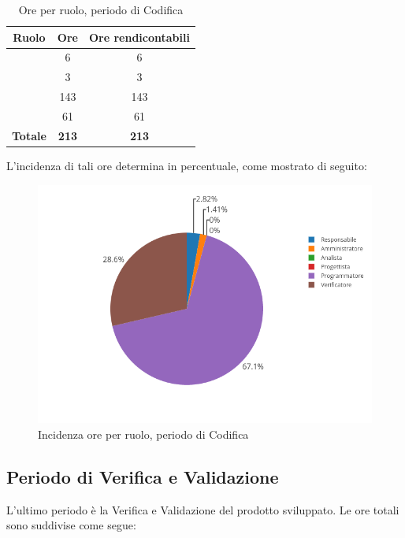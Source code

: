 \begin{table}[H]
	\begin{center}
		\begin{tabular}{|c|c|c|}
			\hline
			\textbf{Ruolo}	& \textbf{Ore}	& \textbf{Ore rendicontabili} \\
			\hline
			\Res	&	6	&	6	\\
			\hline
			\Amm	&	3	&	3	\\
			\hline
			\Progr   &	143   &	143	\\
			\hline
			\Ver	&	61	&	61	\\
			\hline
			\textbf{Totale} & \textbf{213} & \textbf{213} \\
			\hline
		\end{tabular}
	\end{center}
	\caption{Ore per ruolo, periodo di Codifica}
\end{table}

L'incidenza di tali ore determina in percentuale, come mostrato di seguito:
\begin{figure}[H]
	\centering
	\includegraphics[scale=0.6]{img/Codifica.png}
	\caption{Incidenza ore per ruolo, periodo di Codifica}
\end{figure}

\subsection{Periodo di Verifica e Validazione}
L'ultimo periodo è la Verifica e Validazione del prodotto sviluppato. Le ore totali sono suddivise come segue:

